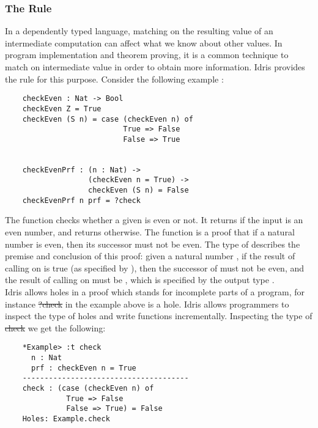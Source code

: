 \subsubsection*{The \textbf{} Rule}
In a dependently typed language, matching on the resulting value of an intermediate computation can affect what we know about other values. In program implementation and theorem proving, it is a common technique to match on intermediate value in order to obtain more information. Idris provides the  rule for this purpose. Consider the following example : 
\begin{lstlisting}
    checkEven : Nat -> Bool
    checkEven Z = True
    checkEven (S n) = case (checkEven n) of 
                           True => False
                           False => True


    checkEvenPrf : (n : Nat) -> 
                   (checkEven n = True) -> 
                   checkEven (S n) = False
    checkEvenPrf n prf = ?check
\end{lstlisting}

The  function checks whether a given  is even or not. It returns  if the input  is an even number, and returns  otherwise. The  function is a proof that if a natural number is even, then its successor must not be even. The type of  describes the premise and conclusion of this proof: given a natural number , if the result of calling  on  is true (as specified by ), then the successor of  must not be even, and the result of calling  on  must be , which is specified by the output type . 
\\


Idris allows holes in a proof which stands for incomplete parts of a program, for instance \st{?check} in the example above is a hole. Idris allows programmers to inspect the type of holes and write functions incrementally. Inspecting the type of \st{check} we get the following:
\begin{lstlisting}
    *Example> :t check
      n : Nat
      prf : checkEven n = True
    --------------------------------------
    check : (case (checkEven n) of   
              True => False 
              False => True) = False
    Holes: Example.check
\end{lstlisting}

